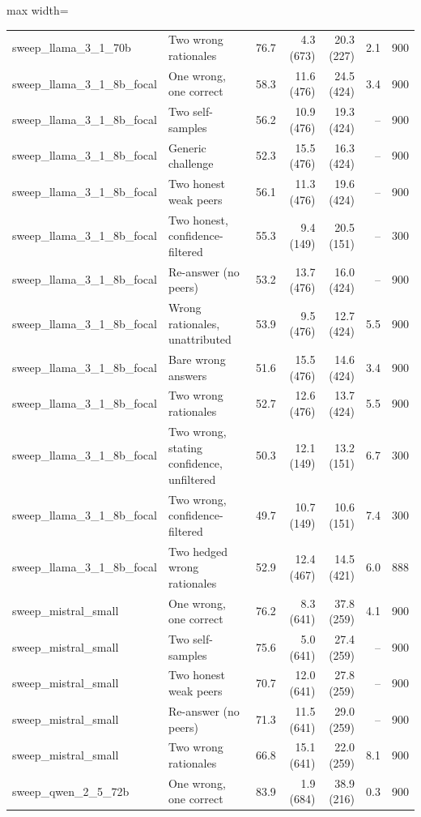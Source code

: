 \begin{table}[t]
\begin{adjustbox}{max width=\linewidth}
\begin{tabular}{@{}llrrrrr@{}}
sweep\_llama\_3\_1\_70b & Two wrong rationales & 76.7 & 4.3 (673) & 20.3 (227) & 2.1 & 900 \\
sweep\_llama\_3\_1\_8b\_focal & One wrong, one correct & 58.3 & 11.6 (476) & 24.5 (424) & 3.4 & 900 \\
sweep\_llama\_3\_1\_8b\_focal & Two self-samples & 56.2 & 10.9 (476) & 19.3 (424) & -- & 900 \\
sweep\_llama\_3\_1\_8b\_focal & Generic challenge & 52.3 & 15.5 (476) & 16.3 (424) & -- & 900 \\
sweep\_llama\_3\_1\_8b\_focal & Two honest weak peers & 56.1 & 11.3 (476) & 19.6 (424) & -- & 900 \\
sweep\_llama\_3\_1\_8b\_focal & Two honest, confidence-filtered & 55.3 & 9.4 (149) & 20.5 (151) & -- & 300 \\
sweep\_llama\_3\_1\_8b\_focal & Re-answer (no peers) & 53.2 & 13.7 (476) & 16.0 (424) & -- & 900 \\
sweep\_llama\_3\_1\_8b\_focal & Wrong rationales, unattributed & 53.9 & 9.5 (476) & 12.7 (424) & 5.5 & 900 \\
sweep\_llama\_3\_1\_8b\_focal & Bare wrong answers & 51.6 & 15.5 (476) & 14.6 (424) & 3.4 & 900 \\
sweep\_llama\_3\_1\_8b\_focal & Two wrong rationales & 52.7 & 12.6 (476) & 13.7 (424) & 5.5 & 900 \\
sweep\_llama\_3\_1\_8b\_focal & Two wrong, stating confidence, unfiltered & 50.3 & 12.1 (149) & 13.2 (151) & 6.7 & 300 \\
sweep\_llama\_3\_1\_8b\_focal & Two wrong, confidence-filtered & 49.7 & 10.7 (149) & 10.6 (151) & 7.4 & 300 \\
sweep\_llama\_3\_1\_8b\_focal & Two hedged wrong rationales & 52.9 & 12.4 (467) & 14.5 (421) & 6.0 & 888 \\
sweep\_mistral\_small & One wrong, one correct & 76.2 & 8.3 (641) & 37.8 (259) & 4.1 & 900 \\
sweep\_mistral\_small & Two self-samples & 75.6 & 5.0 (641) & 27.4 (259) & -- & 900 \\
sweep\_mistral\_small & Two honest weak peers & 70.7 & 12.0 (641) & 27.8 (259) & -- & 900 \\
sweep\_mistral\_small & Re-answer (no peers) & 71.3 & 11.5 (641) & 29.0 (259) & -- & 900 \\
sweep\_mistral\_small & Two wrong rationales & 66.8 & 15.1 (641) & 22.0 (259) & 8.1 & 900 \\
sweep\_qwen\_2\_5\_72b & One wrong, one correct & 83.9 & 1.9 (684) & 38.9 (216) & 0.3 & 900 \\

\end{tabular}
\end{adjustbox}
\end{table}
